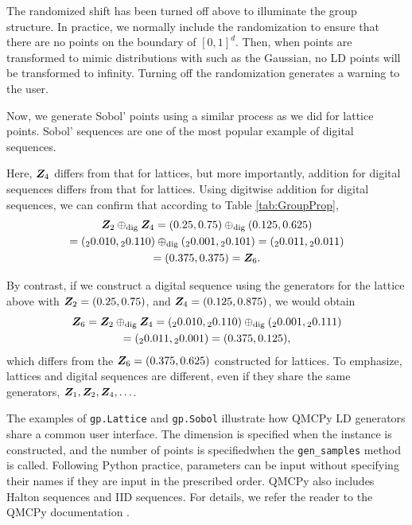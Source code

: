 \documentclass[graybox,footinfo]{svmult}
\newcommand{\dig}{\textup{dig}}
\begin{document}
The randomized shift has been turned off above to illuminate the group structure.  In practice, we normally include the randomization to ensure that there are no points on the boundary of $[0,1]^d$.  Then, when points are transformed to mimic distributions with such as the Gaussian, no LD points will be transformed to infinity.  Turning off the randomization generates a warning to the user.

Now, we generate Sobol' points using a similar process as we did for lattice points.  Sobol' sequences are one of the most popular example of digital sequences.

Here, ${\boldsymbol{Z}}_4$ differs from that for lattices, but more importantly, addition for digital sequences differs from that for lattices.  Using digitwise addition for digital sequences, we can confirm that according to Table \ref{tab:GroupProp},
\begin{multline*}
\bsZ_2 \oplus_{\dig} \bsZ_4 = (0.25,0.75)  \oplus_{\dig} (0.125,0.625) \\
=  ({}_20.010,{}_20.110)  \oplus_{\dig} ({}_20.001,{}_20.101) = ({}_20.011,{}_20.011) \\
= (0.375,0.375) = \bsZ_6.
\end{multline*}

By contrast, if we construct a digital sequence using the generators for the lattice above with ${\boldsymbol{Z}}_2 = (0.25, 0.75)$, and ${\boldsymbol{Z}}_4 = (0.125, 0.875)$, we would obtain
\begin{multline*}
\bsZ_6 = \bsZ_2 \oplus_{\dig} \bsZ_4   = ({}_20.010,{}_20.110)  \oplus_{\dig} ({}_20.001,{}_20.111)  \\
= ({}_20.011,{}_20.001) = (0.375, 0.125),
\end{multline*}
which differs from the ${\boldsymbol{Z}}_6=(0.375, 0.625)$ constructed for lattices.  To emphasize, lattices and digital sequences are different, even if they share the same generators, ${\boldsymbol{Z}}_1, {\boldsymbol{Z}}_2, {\boldsymbol{Z}}_4, \ldots$.

The examples of \texttt{gp.Lattice} and \texttt{gp.Sobol} illustrate how QMCPy LD generators share a common user interface.  The dimension is specified when the instance is constructed, and the number of points is specifiedwhen the \texttt{gen\_samples} method is called.  Following Python practice, parameters can be input without specifying their names if they are input in the prescribed order.  QMCPy also includes Halton sequences and IID sequences.  For details, we refer the reader to the QMCPy documentation \cite{QMCPyDocs}.
\end{document}
